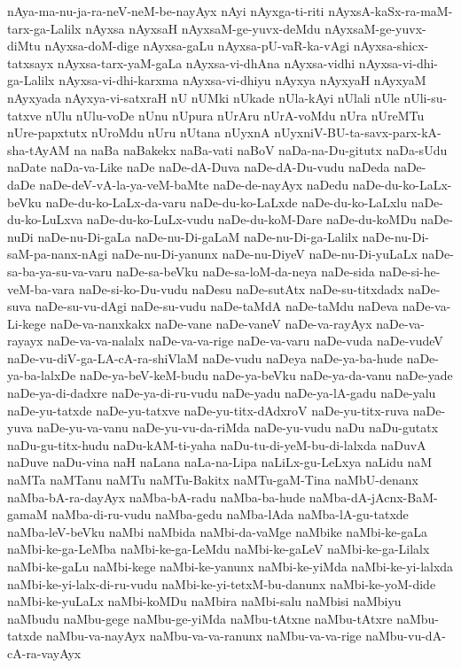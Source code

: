 {nAya-ma-nu-ja-ra-neV-neM-be-nayAyx
nAyi
nAyxga-ti-riti
nAyxsA-kaSx-ra-maM-tarx-ga-Lalilx
nAyxsa
nAyxsaH
nAyxsaM-ge-yuvx-deMdu
nAyxsaM-ge-yuvx-diMtu
nAyxsa-doM-dige
nAyxsa-gaLu
nAyxsa-pU-vaR-ka-vAgi
nAyxsa-shicx-tatxsayx
nAyxsa-tarx-yaM-gaLa
nAyxsa-vi-dhAna
nAyxsa-vidhi
nAyxsa-vi-dhi-ga-Lalilx
nAyxsa-vi-dhi-karxma
nAyxsa-vi-dhiyu
nAyxya
nAyxyaH
nAyxyaM
nAyxyada
nAyxya-vi-satxraH
nU
nUMki
nUkade
nUla-kAyi
nUlali
nUle
nUli-su-tatxve
nUlu
nUlu-voDe
nUnu
nUpura
nUrAru
nUrA-voMdu
nUra
nUreMTu
nUre-papxtutx
nUroMdu
nUru
nUtana
nUyxnA
nUyxniV-BU-ta-savx-parx-kA-sha-tAyAM
na
naBa
naBakekx
naBa-vati
naBoV
naDa-na-Du-gitutx
naDa-sUdu
naDate
naDa-va-Like
naDe
naDe-dA-Duva
naDe-dA-Du-vudu
naDeda
naDe-daDe
naDe-deV-vA-la-ya-veM-baMte
naDe-de-nayAyx
naDedu
naDe-du-ko-LaLx-beVku
naDe-du-ko-LaLx-da-varu
naDe-du-ko-LaLxde
naDe-du-ko-LaLxlu
naDe-du-ko-LuLxva
naDe-du-ko-LuLx-vudu
naDe-du-koM-Dare
naDe-du-koMDu
naDe-nuDi
naDe-nu-Di-gaLa
naDe-nu-Di-gaLaM
naDe-nu-Di-ga-Lalilx
naDe-nu-Di-saM-pa-nanx-nAgi
naDe-nu-Di-yanunx
naDe-nu-DiyeV
naDe-nu-Di-yuLaLx
naDe-sa-ba-ya-su-va-varu
naDe-sa-beVku
naDe-sa-loM-da-neya
naDe-sida
naDe-si-he-veM-ba-vara
naDe-si-ko-Du-vudu
naDesu
naDe-sutAtx
naDe-su-titxdadx
naDe-suva
naDe-su-vu-dAgi
naDe-su-vudu
naDe-taMdA
naDe-taMdu
naDeva
naDe-va-Li-kege
naDe-va-nanxkakx
naDe-vane
naDe-vaneV
naDe-va-rayAyx
naDe-va-rayayx
naDe-va-va-nalalx
naDe-va-va-rige
naDe-va-varu
naDe-vuda
naDe-vudeV
naDe-vu-diV-ga-LA-cA-ra-shiVlaM
naDe-vudu
naDeya
naDe-ya-ba-hude
naDe-ya-ba-lalxDe
naDe-ya-beV-keM-budu
naDe-ya-beVku
naDe-ya-da-vanu
naDe-yade
naDe-ya-di-dadxre
naDe-ya-di-ru-vudu
naDe-yadu
naDe-ya-lA-gadu
naDe-yalu
naDe-yu-tatxde
naDe-yu-tatxve
naDe-yu-titx-dAdxroV
naDe-yu-titx-ruva
naDe-yuva
naDe-yu-va-vanu
naDe-yu-vu-da-riMda
naDe-yu-vudu
naDu
naDu-gutatx
naDu-gu-titx-hudu
naDu-kAM-ti-yaha
naDu-tu-di-yeM-bu-di-lalxda
naDuvA
naDuve
naDu-vina
naH
naLana
naLa-na-Lipa
naLiLx-gu-LeLxya
naLidu
naM
naMTa
naMTanu
naMTu
naMTu-Bakitx
naMTu-gaM-Tina
naMbU-denanx
naMba-bA-ra-dayAyx
naMba-bA-radu
naMba-ba-hude
naMba-dA-jAcnx-BaM-gamaM
naMba-di-ru-vudu
naMba-gedu
naMba-lAda
naMba-lA-gu-tatxde
naMba-leV-beVku
naMbi
naMbida
naMbi-da-vaMge
naMbike
naMbi-ke-gaLa
naMbi-ke-ga-LeMba
naMbi-ke-ga-LeMdu
naMbi-ke-gaLeV
naMbi-ke-ga-Lilalx
naMbi-ke-gaLu
naMbi-kege
naMbi-ke-yanunx
naMbi-ke-yiMda
naMbi-ke-yi-lalxda
naMbi-ke-yi-lalx-di-ru-vudu
naMbi-ke-yi-tetxM-bu-danunx
naMbi-ke-yoM-dide
naMbi-ke-yuLaLx
naMbi-koMDu
naMbira
naMbi-salu
naMbisi
naMbiyu
naMbudu
naMbu-gege
naMbu-ge-yiMda
naMbu-tAtxne
naMbu-tAtxre
naMbu-tatxde
naMbu-va-nayAyx
naMbu-va-va-ranunx
naMbu-va-va-rige
naMbu-vu-dA-cA-ra-vayAyx
}
